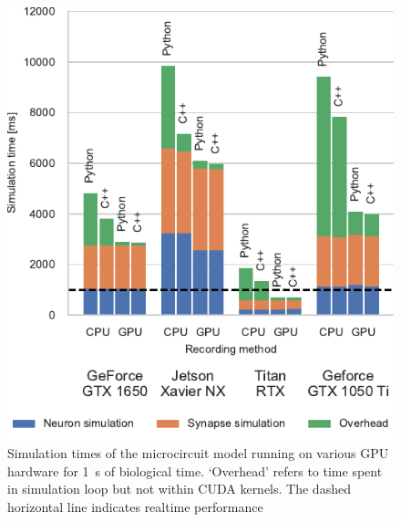 \documentclass[utf8]{frontiersSCNS} %
\begin{document}
%
\begin{figure}[t!]
    \begin{center}
        \includegraphics{figures/microcircuit_overheads.pdf}
    \end{center}
    \caption{Simulation times of the microcircuit model running on various GPU hardware for \SI{1}{\second} of biological time.
    `Overhead' refers to time spent in simulation loop but not within CUDA kernels.
    The dashed horizontal line indicates realtime performance}
    \label{fig:microcircuit_overheads}
\end{figure}
%
\end{document}
